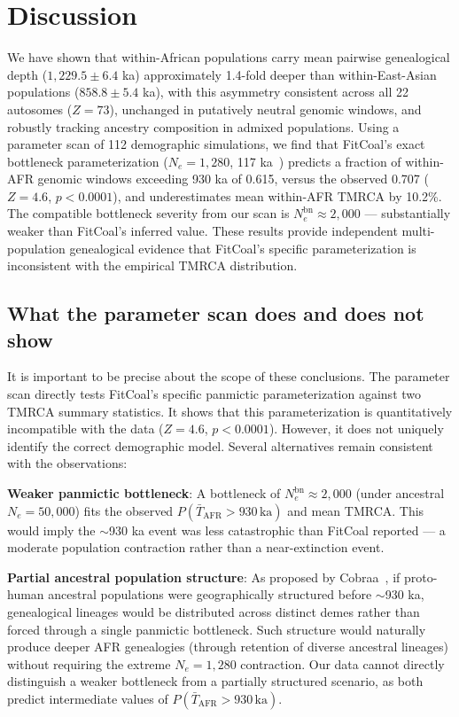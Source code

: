 
\section*{Discussion}

We have shown that within-African populations carry mean pairwise genealogical depth ($1{,}229.5 \pm 6.4$ ka) approximately 1.4-fold deeper than within-East-Asian populations ($858.8 \pm 5.4$ ka), with this asymmetry consistent across all 22 autosomes ($Z = 73$), unchanged in putatively neutral genomic windows, and robustly tracking ancestry composition in admixed populations. Using a parameter scan of 112 demographic simulations, we find that FitCoal's exact bottleneck parameterization ($N_e = 1{,}280$, 117 ka~\citep{Hu2023}) predicts a fraction of within-AFR genomic windows exceeding 930 ka of 0.615, versus the observed 0.707 ($Z = 4.6$, $p < 0.0001$), and underestimates mean within-AFR TMRCA by 10.2\%. The compatible bottleneck severity from our scan is $N_e^{\text{bn}} \approx 2{,}000$ --- substantially weaker than FitCoal's inferred value. These results provide independent multi-population genealogical evidence that FitCoal's specific parameterization is inconsistent with the empirical TMRCA distribution.

\subsection*{What the parameter scan does and does not show}

It is important to be precise about the scope of these conclusions. The parameter scan directly tests FitCoal's specific panmictic parameterization against two TMRCA summary statistics. It shows that this parameterization is quantitatively incompatible with the data ($Z = 4.6$, $p < 0.0001$). However, it does not uniquely identify the correct demographic model. Several alternatives remain consistent with the observations:

\textbf{Weaker panmictic bottleneck}: A bottleneck of $N_e^{\text{bn}} \approx 2{,}000$ (under ancestral $N_e = 50{,}000$) fits the observed $P(\bar{T}_\text{AFR} > 930\,\text{ka})$ and mean TMRCA. This would imply the $\sim$930 ka event was less catastrophic than FitCoal reported --- a moderate population contraction rather than a near-extinction event.

\textbf{Partial ancestral population structure}: As proposed by Cobraa~\citep{Cousins2025}, if proto-human ancestral populations were geographically structured before $\sim$930 ka, genealogical lineages would be distributed across distinct demes rather than forced through a single panmictic bottleneck. Such structure would naturally produce deeper AFR genealogies (through retention of diverse ancestral lineages) without requiring the extreme $N_e = 1{,}280$ contraction. Our data cannot directly distinguish a weaker bottleneck from a partially structured scenario, as both predict intermediate values of $P(\bar{T}_\text{AFR} > 930\,\text{ka})$.

